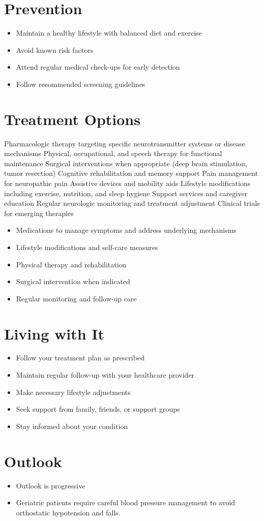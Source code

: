 \section{Prevention}
\begin{itemize}[noitemsep]
  \item Maintain a healthy lifestyle with balanced diet and exercise
  \item Avoid known risk factors
  \item Attend regular medical check-ups for early detection
  \item Follow recommended screening guidelines
\end{itemize}
\section{Treatment Options}
Pharmacologic therapy targeting specific neurotransmitter systems or disease mechanisms Physical, occupational, and speech therapy for functional maintenance Surgical interventions when appropriate (deep brain stimulation, tumor resection) Cognitive rehabilitation and memory support Pain management for neuropathic pain Assistive devices and mobility aids Lifestyle modifications including exercise, nutrition, and sleep hygiene Support services and caregiver education Regular neurologic monitoring and treatment adjustment Clinical trials for emerging therapies

\begin{itemize}[noitemsep]
  \item Medications to manage symptoms and address underlying mechanisms
  \item Lifestyle modifications and self-care measures
  \item Physical therapy and rehabilitation
  \item Surgical intervention when indicated
  \item Regular monitoring and follow-up care
\end{itemize}
\section{Living with It}
\begin{itemize}[noitemsep]
  \item Follow your treatment plan as prescribed
  \item Maintain regular follow-up with your healthcare provider
  \item Make necessary lifestyle adjustments
  \item Seek support from family, friends, or support groups
  \item Stay informed about your condition
\end{itemize}
\section{Outlook}
\begin{itemize}[noitemsep]
  \item Outlook is progressive
  \item Geriatric patients require careful blood pressure management to avoid orthostatic hypotension and falls.
\end{itemize}
